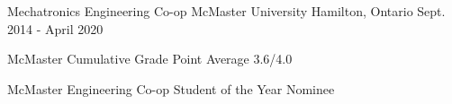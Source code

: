 
\begin{cventries}

  \cventry
    {Mechatronics Engineering Co-op} %
    {McMaster University} %
    {Hamilton, Ontario} %
    {Sept. 2014 - April 2020} %
    {
      \begin{cvitems} %
        \item {McMaster Cumulative Grade Point Average 3.6/4.0}
        \item {McMaster Engineering Co-op Student of the Year Nominee}
      \end{cvitems}
    }



\end{cventries}
